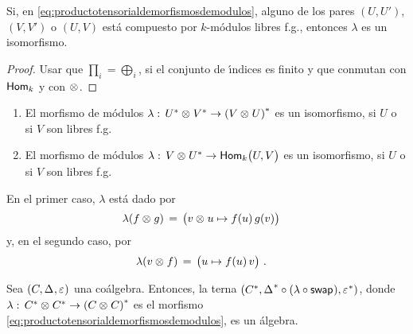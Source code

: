 \begin{teoIsomorfismoProductoTensorialDeMorfismosDeModulos}%
	\label{thm:isomorfismoproductotensorialdemorfismosdemodulos}
	Si, en \eqref{eq:productotensorialdemorfismosdemodulos}, alguno de los
	pares $(U,U')$, $(V,V')$ o $(U,V)$ est\'{a} compuesto por
	$k$-m\'{o}dulos libres f.g., entonces $\lambda$ es un isomorfismo.
\end{teoIsomorfismoProductoTensorialDeMorfismosDeModulos}

\begin{proof}
	Usar que $\prod_i=\bigoplus_i$, si el conjunto de \'{\i}ndices es
	finito y que conmutan con $\Hom[k]$ y con $\tensor$.
\end{proof}

\begin{coroIsomorfismoProductoTensorialDeMorfismosDeModulos}%
	\label{coro:isomorfismoproductotensorialdemorfismosdemodulos}
	\begin{enumerate}
		\item El morfismo de m\'{o}dulos
			\begin{math}
				\lambda:\,\dual U\tensor\dual V\rightarrow
					\dual{(V\tensor U)}
			\end{math} es un isomorfismo, si $U$ o si $V$ son
			libres f.g.
		\item El morfismo de m\'{o}dulos
			\begin{math}
				\lambda:\,V\tensor\dual U\rightarrow
					\Hom[k]\big(U,V\big)
			\end{math} es un isomorfismo, si $U$ o si $V$ son
			libres f.g.
	\end{enumerate}
\end{coroIsomorfismoProductoTensorialDeMorfismosDeModulos}

En el primer caso, $\lambda$ est\'{a} dado por
\begin{align*}
	\lambda(f\tensor g) & \,=\,\big(v\tensor u\mapsto f(u)\,g(v)\big)
\end{align*}
%
y, en el segundo caso, por
\begin{align*}
	\lambda(v\tensor f) & \,=\,\big(u\mapsto f(u)\,v\big)
	\text{ .}
\end{align*}
%

\begin{propoAlgebraDual}\label{propo:algebradual}
	Sea $(C,\coproducto,\counidad)$ una co\'{a}lgebra. Entonces, la terna
	$(\dual C,\dual\coproducto\circ(\lambda\circ\swap),\dual\counidad)$,
	donde $\lambda:\,\dual C\tensor\dual C\rightarrow\dual{(C\tensor C)}$
	es el morfismo \eqref{eq:productotensorialdemorfismosdemodulos}, es un
	\'{a}lgebra.
\end{propoAlgebraDual}

